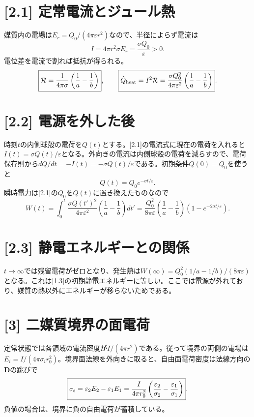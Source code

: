 \documentclass[11pt,a4paper]{article}
\begin{document}
\section*{[2.1] 定常電流とジュール熱}
媒質内の電場は$E_r=Q_0/(4\pi\varepsilon r^2)$なので、半径によらず電流は
\begin{equation}
 I=4\pi r^2\sigma E_r=\frac{\sigma Q_0}{\varepsilon}>0.
\end{equation}
電位差を電流で割れば抵抗が得られる。
\begin{equation}
 \boxed{\mathcal R=\frac{1}{4\pi\sigma}\left(\frac1a-\frac1b\right)},\qquad
 \boxed{\dot Q_{\rm heat}=I^2\mathcal R=\frac{\sigma Q_0^2}{4\pi\varepsilon^2}\left(\frac1a-\frac1b\right)}.
\end{equation}

\section*{[2.2] 電源を外した後}
時刻$t$の内側球殻の電荷を$Q(t)$とする。[2.1]の電流式に現在の電荷を入れると$I(t)=\sigma Q(t)/\varepsilon$となる。外向きの電流は内側球殻の電荷を減らすので、電荷保存則から$dQ/dt=-I(t)=-\sigma Q(t)/\varepsilon$である。初期条件$Q(0)=Q_0$を使うと
\begin{equation}
 Q(t)=Q_0e^{-\sigma t/\varepsilon}.
\end{equation}
瞬時電力は[2.1]の$Q_0$を$Q(t)$に置き換えたものなので
\begin{equation}
 W(t)=\int_0^t\frac{\sigma Q(t')^2}{4\pi\varepsilon^2}\left(\frac1a-\frac1b\right)dt'
 =\boxed{\frac{Q_0^2}{8\pi\varepsilon}\left(\frac1a-\frac1b\right)\left(1-e^{-2\sigma t/\varepsilon}\right)}.
\end{equation}

\section*{[2.3] 静電エネルギーとの関係}
$t\to\infty$では残留電荷がゼロとなり、発生熱は$W(\infty)=Q_0^2(1/a-1/b)/(8\pi\varepsilon)$となる。これは[1.3]の初期静電エネルギーに等しい。ここでは電源が外れており、媒質の熱以外にエネルギーが移らないためである。

\section*{[3] 二媒質境界の面電荷}
定常状態では各領域の電流密度が$I/(4\pi r^2)$である。従って境界の両側の電場は$E_i=I/(4\pi\sigma_i r_0^2)$。境界面法線を外向きに取ると、自由面電荷密度は法線方向の$\boldsymbol D$の跳びで
\begin{equation}
 \boxed{\sigma_{\rm s}=\varepsilon_2E_2-\varepsilon_1E_1
 =\frac{I}{4\pi r_0^2}\left(\frac{\varepsilon_2}{\sigma_2}-\frac{\varepsilon_1}{\sigma_1}\right)}.
\end{equation}
負値の場合は、境界に負の自由電荷が蓄積している。
\end{document}
